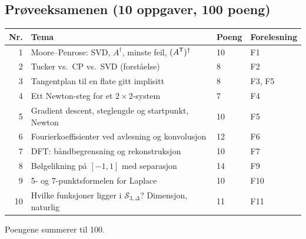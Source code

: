 \subsection{Prøveeksamenen (10 oppgaver, 100 poeng)}
\begin{center}
\small
\begin{tabular}{@{}rlll@{}}
\toprule
Nr. & Tema & Poeng & Forelesning\\
\midrule
1 & Moore--Penrose: SVD, $A^\dagger$, minste feil, $(A^{\mathsf{T}})^\dagger$ & 10 & F1\\
2 & Tucker vs.\ CP vs.\ SVD (forståelse) & 8 & F2\\
3 & Tangentplan til en flate gitt implisitt & 8 & F3, F5\\
4 & Ett Newton-steg for et $2\times2$-system & 7 & F4\\
5 & Gradient descent, steglengde og startpunkt, Newton & 10 & F5\\
6 & Fourierkoeffisienter ved avlesning og konvolusjon & 12 & F6\\
7 & DFT: båndbegrensning og rekonstruksjon & 10 & F7\\
8 & Bølgelikning på $[-1,1]$ med separasjon & 14 & F9\\
9 & 5- og 7-punktsformelen for Laplace & 10 & F10\\
10 & Hvilke funksjoner ligger i $\mathcal S_{3,\Delta}$? Dimensjon, naturlig & 11 & F11\\
\bottomrule
\end{tabular}
\end{center}
Poengene summerer til 100.

